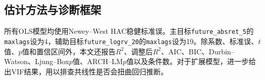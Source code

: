 \subsection{估计方法与诊断框架}

所有OLS模型均使用Newey--West HAC稳健标准误。主目标\texttt{future\_absret\_5}的\texttt{maxlags}设为4，辅助目标\texttt{future\_logrv\_20}的\texttt{maxlags}设为19。除系数、标准误、\(t\)值、\(p\)值和置信区间外，本文还报告\(R^2\)、调整后\(R^2\)、AIC、BIC、Durbin--Watson、Ljung--Box\(p\)值、ARCH--LM\(p\)值以及条件数。对于扩展模型，进一步给出VIF结果，用以排查共线性是否会扭曲回归推断。
